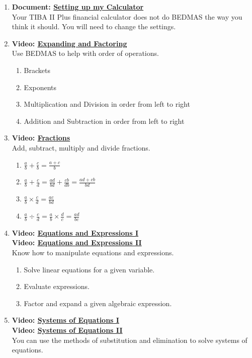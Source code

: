 \documentclass[
]{book}
\providecommand{\tightlist}{%
  \setlength{\itemsep}{0pt}\setlength{\parskip}{0pt}}
\begin{document}
\begin{enumerate}
\def\labelenumi{\arabic{enumi}.}
\item
  \textbf{Document: \href{https://www.wikihow.com/Set-Decimal-Places-on-a-TI-BA-II-Plus-Calculator}{Setting up my Calculator}}\\
  Your TIBA II Plus financial calculator does not do BEDMAS the way you think it should. You will need to change the settings.
\item
  \textbf{Video: \href{https://youtu.be/ezGExislcbU}{Expanding and Factoring}}\\
  Use BEDMAS to help with order of operations.

  \begin{enumerate}
  \def\labelenumii{\arabic{enumii}.}
  \tightlist
  \item
    Brackets
  \item
    Exponents
  \item
    Multiplication and Division in order from left to right
  \item
    Addition and Subtraction in order from left to right
  \end{enumerate}
\item
  \textbf{Video: \href{https://youtu.be/Yf2jnQHyHdQ}{Fractions}}\\
  Add, subtract, multiply and divide fractions.

  \begin{enumerate}
  \def\labelenumii{\arabic{enumii}.}
  \tightlist
  \item
    \(\frac{a}{b} + \frac{c}{b} = \frac{a+c}{b}\)
  \item
    \(\frac{a}{b} + \frac{c}{d} = \frac{ad}{bd} + \frac{cb}{db} =  \frac{ad + cb}{bd}\)
  \item
    \(\frac{a}{b} \times \frac{c}{d} = \frac{ac}{bd}\)
  \item
    \(\frac{a}{b} \div \frac{c}{d} = \frac{a}{b} \times \frac{d}{c} = \frac{ad}{bc}\)
  \end{enumerate}
\item
  \textbf{Video: \href{https://youtu.be/i8xFdGZ5zOU}{Equations and Expressions I}}\\
  \textbf{Video: \href{https://youtu.be/Vb_2Aqq08ok}{Equations and Expressions II}}\\
  Know how to manipulate equations and expressions.

  \begin{enumerate}
  \def\labelenumii{\arabic{enumii}.}
  \tightlist
  \item
    Solve linear equations for a given variable.
  \item
    Evaluate expressions.
  \item
    Factor and expand a given algebraic expression.
  \end{enumerate}
\item
  \textbf{Video: \href{https://youtu.be/ooUss4RfLHI}{Systems of Equations I}}\\
  \textbf{Video: \href{https://youtu.be/rDDTETJjmyY}{Systems of Equations II}}\\
  You can use the methods of substitution and elimination to solve systems of equations.


\end{enumerate}
\end{document}
